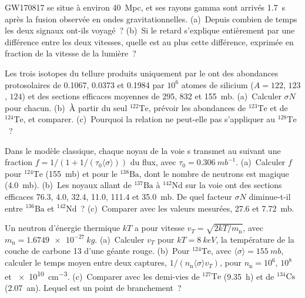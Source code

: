\begin{exercise}[$\star$]\label{exo:b3:origin-of-elements:4}
GW170817 se situe à environ \qty{40}{Mpc}, et ses rayons gamma sont arrivés
\qty{1.7}{s} après la fusion observée en ondes gravitationnelles. (a)~Depuis combien de temps
les deux signaux ont-ils voyagé~? (b)~Si le retard s'explique entièrement par
une différence entre les deux vitesses, quelle est au plus cette différence,
exprimée en fraction de la vitesse de la lumière~?
\end{exercise}

\begin{exercise}[$\star\star$]\label{exo:b3:origin-of-elements:5}
Les trois isotopes du tellure produits uniquement par le  ont des abondances
protosolaires de \num{0.1067}, \num{0.0373} et \num{0.1984} par $10^6$ atomes de silicium
($A = 122$, $123$, $124$) et des sections efficaces moyennes de \num{295},
\num{832} et \qty{155}{mb}. (a)~Calculer $\sigma N$ pour chacun. (b)~À partir du seul
$^{122}\mathrm{Te}$, prévoir les abondances de $^{123}\mathrm{Te}$
et de $^{124}\mathrm{Te}$, et comparer. (c)~Pourquoi la relation ne peut-elle pas
s'appliquer au $^{128}\mathrm{Te}$~?
\end{exercise}

\begin{exercise}[$\star\star$]\label{exo:b3:origin-of-elements:6}
Dans le modèle classique, chaque noyau de la voie s transmet au suivant une fraction
$f = 1/(1 + 1/(\tau_0\langle\sigma\rangle))$ du
flux, avec $\tau_0 = \qty{0.306}{mb^{-1}}$. (a)~Calculer $f$ pour
$^{124}\mathrm{Te}$ (\qty{155}{mb}) et pour le $^{138}\mathrm{Ba}$, dont le nombre de neutrons est magique
(\qty{4.0}{mb}). (b)~Les noyaux allant de
$^{137}\mathrm{Ba}$ à $^{142}\mathrm{Nd}$ sur la voie ont des sections efficaces
\num{76.3}, \num{4.0}, \num{32.4}, \num{11.0},
\num{111.4} et \qty{35.0}{mb}. De quel facteur $\sigma N$ diminue-t-il entre
$^{136}\mathrm{Ba}$ et $^{142}\mathrm{Nd}$~? (c)~Comparer avec les valeurs mesurées,
\num{27.6} et \qty{7.72}{mb}.
\end{exercise}

\begin{exercise}[$\star\star$]\label{exo:b3:origin-of-elements:7}
Un neutron d'énergie thermique $kT$ a pour vitesse
$v_T = \sqrt{2kT/m_\mathrm{n}}$, avec $m_\mathrm{n} = \qty{1.6749e-27}{kg}$.
(a)~Calculer $v_T$ pour $kT = \qty{8}{keV}$, la température de la
couche de carbone 13 d'une géante rouge. (b)~Pour $^{124}\mathrm{Te}$, avec
$\langle\sigma\rangle = \qty{155}{mb}$, calculer le temps moyen entre
deux captures, $1/(n_\mathrm{n}\langle\sigma\rangle v_T)$, pour
$n_\mathrm{n} = 10^6$, $10^8$ et \qty{e10}{cm^{-3}}. (c)~Comparer avec les
demi-vies de $^{127}\mathrm{Te}$ (\qty{9.35}{h}) et de
$^{134}\mathrm{Cs}$ (\qty{2.07}{an}). Lequel est un point de branchement~?
\end{exercise}

